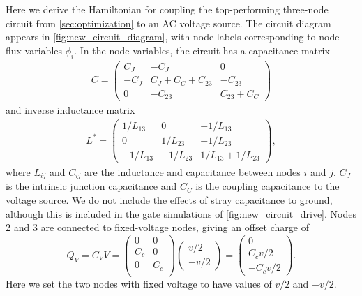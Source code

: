 Here we derive the Hamiltonian for coupling the top-performing three-node circuit from \cref{sec:optimization} to an AC voltage source. The circuit diagram appears in \cref{fig:new_circuit_diagram}, with node labels corresponding to node-flux variables $\phi_i$.
In the node variables, the circuit has a capacitance matrix
\begin{align}
    C = \begin{pmatrix}
        C_J & -C_J & 0 \\
        -C_J & C_J + C_C + C_{23} & -C_{23} \\
        0 & -C_{23} & C_{23} + C_C
    \end{pmatrix}
\end{align}
and inverse inductance matrix
\begin{align}
    L^* = \begin{pmatrix}
        1/L_{13} & 0 & -1/L_{13} \\
        0 & 1/L_{23} & -1/L_{23} \\
        -1/L_{13} & -1/L_{23} & 1/L_{13} + 1/L_{23}
    \end{pmatrix},
\end{align}
where $L_{ij}$ and $C_{ij}$ are the inductance and capacitance between nodes $i$ and $j$. $C_J$ is the intrinsic junction capacitance and $C_C$ is the coupling capacitance to the voltage source. We do not include the effects of stray capacitance to ground, although this is included in the gate simulations of \cref{fig:new_circuit_drive}. Nodes 2 and 3 are connected to fixed-voltage nodes, giving an offset charge of
\begin{equation}
    Q_V = C_VV = \begin{pmatrix}
        0 & 0 \\
        C_c & 0 \\
        0 & C_c \\
    \end{pmatrix}\!\begin{pmatrix}
        v/2 \\
        -v/2
    \end{pmatrix} = \begin{pmatrix}
        0 \\
        C_c v/2 \\
        -C_c v/2
    \end{pmatrix}\!.
\end{equation}
Here we set the two nodes with fixed voltage to have values of $v/2$ and $-v/2$.

